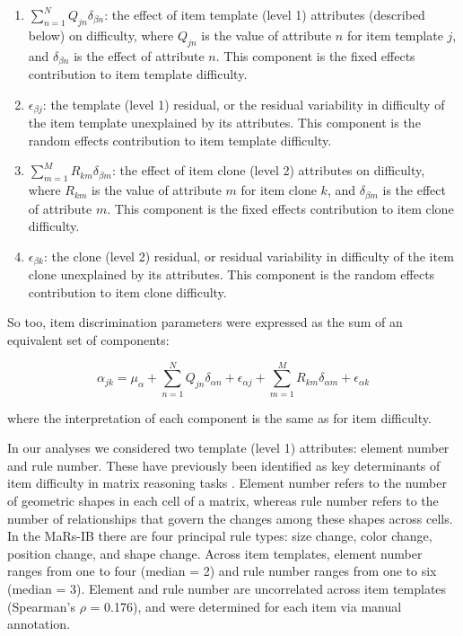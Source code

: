 \documentclass[a4paper,man,natbib,noextraspace]{apa6}
\begin{document}
\begin{enumerate}

\item $\sum_{n=1}^N Q_{jn} \delta_{\beta n}$: the effect of item template (level 1) attributes (described below) on difficulty, where $Q_{jn}$ is the value of attribute $n$ for item template $j$, and $\delta_{\beta n}$ is the effect of attribute $n$. This component is the fixed effects contribution to item template difficulty.

\item $\epsilon_{\beta j}$: the template (level 1) residual, or the residual variability in difficulty of the item template unexplained by its attributes. This component is the random effects contribution to item template difficulty.

\item $\sum_{m=1}^M R_{km} \delta_{\beta m}$: the effect of item clone (level 2) attributes on difficulty, where $R_{km}$ is the value of attribute $m$ for item clone $k$, and $\delta_{\beta m}$ is the effect of attribute $m$. This component is the fixed effects contribution to item clone difficulty.

\item $\epsilon_{\beta k}$: the clone (level 2) residual, or residual variability in difficulty of the item clone unexplained by its attributes. This component is the random effects contribution to item clone difficulty.

\end{enumerate}

\noindent So too, item discrimination parameters were expressed as the sum of an equivalent set of components:

\begin{equation}
\alpha_{jk} = \mu_\alpha + \sum_{n=1}^N Q_{jn} \delta_{\alpha n} + \epsilon_{\alpha j} + \sum_{m=1}^M R_{km} \delta_{\alpha m} + \epsilon_{\alpha k}
\end{equation}

\noindent where the interpretation of each component is the same as for item difficulty.

In our analyses we considered two template (level 1) attributes: element number and rule number. These have previously been identified as key determinants of item difficulty in matrix reasoning tasks \citep{embretson1998cognitive, primi2001complexity}. Element number refers to the number of geometric shapes in each cell of a matrix, whereas rule number refers to the number of relationships that govern the changes among these shapes across cells. In the MaRs-IB there are four principal rule types: size change, color change, position change, and shape change. Across item templates, element number ranges from one to four (median = 2) and rule number ranges from one to six (median = 3). Element and rule number are uncorrelated across item templates (Spearman's $\rho$ = 0.176), and were determined for each item via manual annotation.  
\end{document}
